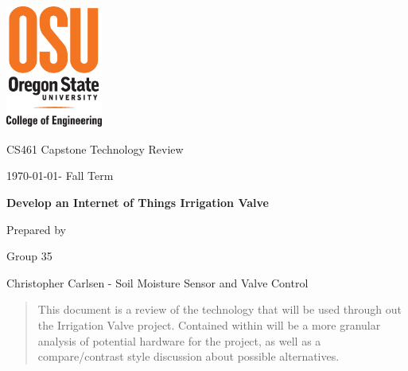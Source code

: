\documentclass[onecolumn, draftclsnofoot,10pt, compsoc]{IEEEtran}
\def \CapstoneTeamName{     Group}
\def \CapstoneTeamNumber{       35}
\def \GroupMemberOne{           Christopher Carlsen - Soil Moisture Sensor and Valve Control}
\def \GroupMemberTwo{           Yizheng Wang}
\def \GroupMemberThree{         Peter Dorich}
\def \CapstoneProjectName{      Develop an Internet of Things Irrigation Valve}
\def \CapstoneSponsorCompany{       OSU \textbar\hspace{.05in} Openly Published Environmental Sensing (OPEnS) Lab}
\def \CapstoneSponsorPerson{        Chet Udell}
\def \DocType{      %
    Technology Review
}
\newcommand{\NameSigPair}[1]{\par
    \makebox[2.75in][r]{#1} \hfil   \makebox[3.25in]{\makebox[2.25in]{\hrulefill} \hfill        \makebox[.75in]{\hrulefill}}
    \par\vspace{-12pt} \textit{\tiny\noindent
        \makebox[2.75in]{} \hfil        \makebox[3.25in]{\makebox[2.25in][r]{Signature} \hfill  \makebox[.75in][r]{Date}}}}
\renewcommand{\NameSigPair}[1]{#1}
\begin{document}
    \begin{titlepage}
        \begin{singlespace}
            \includegraphics[height=4cm]{coe_v_spot1}
            \hfill 
            \par\vspace{.2in}
            \centering
            \scshape{
                \huge CS461 Capstone \DocType \par
                {\large\today - Fall Term}\par
                \vspace{.5in}
                \textbf{\Huge\CapstoneProjectName}\par
                \vfill
                {\large Prepared by }\par
                Group\CapstoneTeamNumber\par
                \vspace{5pt}
                {\Large
                    \NameSigPair{\GroupMemberOne}\par
                }
                \vspace{20pt}
            }
            \begin{abstract}
                This document is a review of the technology that will be used through out the Irrigation Valve project.
                Contained within will be a more granular analysis of potential hardware for the project, as well as a compare/contrast style discussion about possible alternatives.
            \end{abstract}     
        \end{singlespace}
    \end{titlepage}
    \newpage
    \tableofcontents
    \clearpage
    
\end{document}
